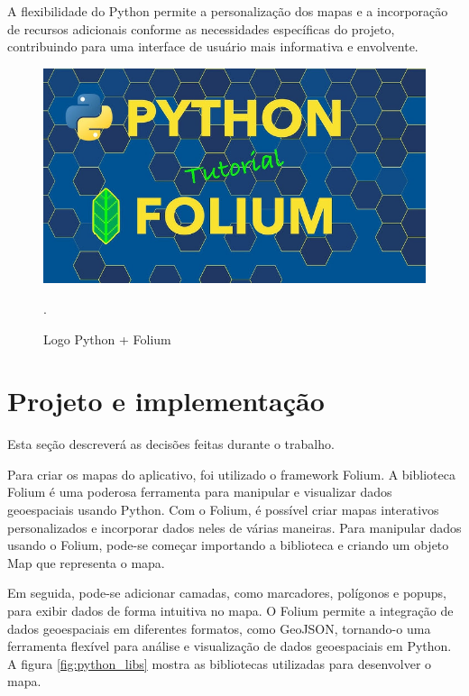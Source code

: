     A flexibilidade do Python permite a personalização dos mapas e a incorporação de recursos adicionais conforme as necessidades específicas do projeto, contribuindo para uma interface de usuário mais informativa e envolvente.

      \begin{figure}[hp]
    \centering
    
    \includegraphics[scale=0.1]{figures/python_folium.jpg}
    
    \caption{Logo Python + Folium }.  
\end{figure}



\section{Projeto e implementação}
Esta seção descreverá as decisões feitas durante o trabalho.

Para criar os mapas do aplicativo, foi utilizado o framework Folium. A biblioteca Folium é uma poderosa ferramenta para manipular e visualizar dados geoespaciais usando Python. Com o Folium, é possível criar mapas interativos personalizados e incorporar dados neles de várias maneiras. Para manipular dados usando o Folium, pode-se começar importando a biblioteca e criando um objeto Map que representa o mapa. 

Em seguida, pode-se adicionar camadas, como marcadores, polígonos e popups, para exibir dados de forma intuitiva no mapa. O Folium permite a integração de dados geoespaciais em diferentes formatos, como GeoJSON, tornando-o uma ferramenta flexível para análise e visualização de dados geoespaciais em Python. A figura \ref{fig:python_libs} mostra as bibliotecas utilizadas para desenvolver o mapa.

